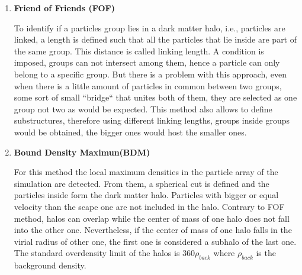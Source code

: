 \begin{enumerate}


\item \textbf{Friend of Friends (FOF)} 

To identify if a particles group lies in a dark matter halo, i.e., particles 
are linked, a length is defined such that all the particles that lie inside 
are part of the same group. This distance is called linking length. A condition 
is imposed, groups can not intersect among them, hence a particle can only belong 
to a specific group. But there is a problem with this approach, even when there is 
a little amount of particles in common between two groups, some sort of small 
``bridge`` that unites both of them, they are selected as one group not two
as would be expected. This method also allows to define substructures, therefore using
different linking lengths, groups inside groups would be obtained, the bigger ones
would host the smaller ones. 


\item \textbf{Bound Density Maximun(BDM)}

For this method the local maximum densities in the particle array of the simulation
are detected. From them, a spherical cut is defined and the particles inside form 
the dark matter halo. Particles with bigger or equal velocity than the scape one
are not included in the halo. 
Contrary to FOF method, halos can overlap while the center of mass of one halo 
does not fall into the other one. Nevertheless, if the center of mass of one halo
falls in the virial radius of other one, the first one is considered a subhalo of the last
one. The standard overdensity limit of the halos is $360\rho_{back}$ where $\rho_{back}$
is the background density. 

\end{enumerate}

